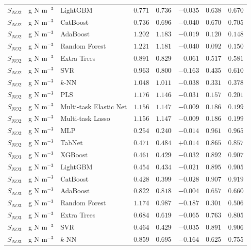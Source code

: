 \begin{longtable}{llp{3.1cm}rrrrr}
$S_{NO2}$ & g N m$^{-3}$ & LightGBM & $0.771$ & $0.736$ & $-0.035$ & $0.638$ & $0.670$ \\
$S_{NO2}$ & g N m$^{-3}$ & CatBoost & $0.736$ & $0.696$ & $-0.040$ & $0.670$ & $0.705$ \\
$S_{NO2}$ & g N m$^{-3}$ & AdaBoost & $1.202$ & $1.183$ & $-0.019$ & $0.120$ & $0.148$ \\
$S_{NO2}$ & g N m$^{-3}$ & Random Forest & $1.221$ & $1.181$ & $-0.040$ & $0.092$ & $0.150$ \\
$S_{NO2}$ & g N m$^{-3}$ & Extra Trees & $0.891$ & $0.829$ & $-0.061$ & $0.517$ & $0.581$ \\
$S_{NO2}$ & g N m$^{-3}$ & SVR & $0.963$ & $0.800$ & $-0.163$ & $0.435$ & $0.610$ \\
$S_{NO2}$ & g N m$^{-3}$ & $k$-NN & $1.048$ & $1.011$ & $-0.038$ & $0.331$ & $0.378$ \\
$S_{NO2}$ & g N m$^{-3}$ & PLS & $1.176$ & $1.146$ & $-0.031$ & $0.157$ & $0.201$ \\
$S_{NO2}$ & g N m$^{-3}$ & Multi-task Elastic Net & $1.156$ & $1.147$ & $-0.009$ & $0.186$ & $0.199$ \\
$S_{NO2}$ & g N m$^{-3}$ & Multi-task Lasso & $1.156$ & $1.147$ & $-0.009$ & $0.186$ & $0.199$ \\
$S_{NO2}$ & g N m$^{-3}$ & MLP & $0.254$ & $0.240$ & $-0.014$ & $0.961$ & $0.965$ \\
$S_{NO2}$ & g N m$^{-3}$ & TabNet & $0.471$ & $0.484$ & $+0.014$ & $0.865$ & $0.857$ \\
$S_{NO3}$ & g N m$^{-3}$ & XGBoost & $0.461$ & $0.429$ & $-0.032$ & $0.892$ & $0.907$ \\
$S_{NO3}$ & g N m$^{-3}$ & LightGBM & $0.454$ & $0.434$ & $-0.021$ & $0.895$ & $0.905$ \\
$S_{NO3}$ & g N m$^{-3}$ & CatBoost & $0.428$ & $0.399$ & $-0.028$ & $0.907$ & $0.919$ \\
$S_{NO3}$ & g N m$^{-3}$ & AdaBoost & $0.822$ & $0.818$ & $-0.004$ & $0.657$ & $0.660$ \\
$S_{NO3}$ & g N m$^{-3}$ & Random Forest & $1.174$ & $0.987$ & $-0.187$ & $0.301$ & $0.506$ \\
$S_{NO3}$ & g N m$^{-3}$ & Extra Trees & $0.684$ & $0.619$ & $-0.065$ & $0.763$ & $0.805$ \\
$S_{NO3}$ & g N m$^{-3}$ & SVR & $0.464$ & $0.429$ & $-0.035$ & $0.891$ & $0.906$ \\
$S_{NO3}$ & g N m$^{-3}$ & $k$-NN & $0.859$ & $0.695$ & $-0.164$ & $0.625$ & $0.755$ \\

\end{longtable}
